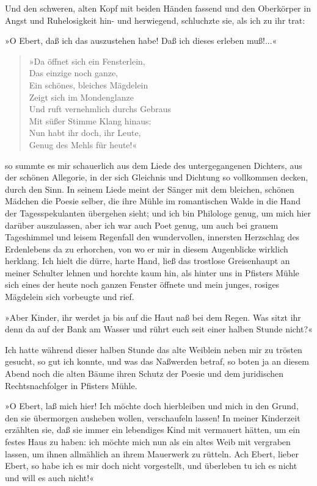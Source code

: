 Und den schweren, alten Kopf mit beiden Händen fassend und den
Oberkörper in Angst und Ruhelosigkeit hin- und herwiegend,
schluchzte sie, als ich zu ihr trat:

»O Ebert, daß ich das auszustehen habe! Daß ich dieses erleben
muß!...«

\begin{verse}
»Da öffnet sich ein Fensterlein,\\
Das einzige noch ganze,\\
Ein schönes, bleiches Mägdelein\\
Zeigt sich im Mondenglanze\\
Und ruft vernehmlich durchs Gebraus\\
Mit süßer Stimme Klang hinaus:\\
Nun habt ihr doch, ihr Leute,\\
Genug des Mehls für heute!«
\end{verse}
\noindent
so summte es mir schauerlich aus dem Liede des
untergegangenen Dichters, aus der schönen Allegorie, in der sich
Gleichnis und Dichtung so vollkommen decken, durch den Sinn. In
seinem Liede meint der Sänger mit dem bleichen, schönen Mädchen die
Poesie selber, die ihre Mühle im romantischen Walde in die Hand der
Tagesspekulanten übergehen sieht; und ich bin Philologe genug, um
mich hier darüber auszulassen, aber ich war auch Poet genug, um
auch bei grauem Tageshimmel und leisem Regenfall den wundervollen,
innersten Herzschlag des Erdenlebens da zu erhorchen, von wo er mir
in diesem Augenblicke wirklich herklang. Ich hielt die dürre, harte
Hand, ließ das trostlose Greisenhaupt an meiner Schulter lehnen und
horchte kaum hin, als hinter uns in Pfisters Mühle sich eines der
heute noch ganzen Fenster öffnete und mein junges, rosiges
Mägdelein sich vorbeugte und rief.

»Aber Kinder, ihr werdet ja bis auf die Haut naß bei dem Regen. Was
sitzt ihr denn da auf der Bank am Wasser und rührt euch seit einer
halben Stunde nicht?«

Ich hatte während dieser halben Stunde das alte Weiblein neben mir
zu trösten gesucht, so gut ich konnte, und was das Naßwerden
betraf, so boten ja an diesem Abend noch die alten Bäume ihren
Schutz der Poesie und dem juridischen Rechtsnachfolger in Pfisters
Mühle.

»O Ebert, laß mich hier! Ich möchte doch hierbleiben und mich in
den Grund, den sie übermorgen ausheben wollen, verschaufeln lassen!
In meiner Kinderzeit erzählten sie, daß sie immer ein lebendiges
Kind mit vermauert hätten, um ein festes Haus zu haben: ich möchte
mich nun als ein altes Weib mit vergraben lassen, um ihnen
allmählich an ihrem Mauerwerk zu rütteln. Ach Ebert, lieber Ebert,
so habe ich es mir doch nicht vorgestellt, und überleben tu ich es
nicht und will es auch nicht!«

